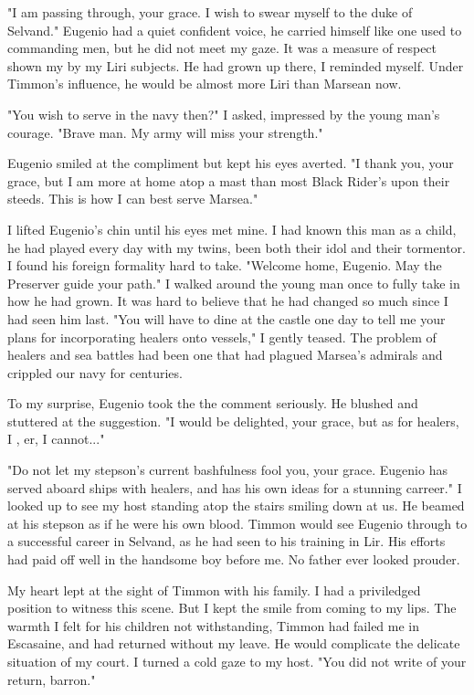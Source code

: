\documentclass{article}
\begin{document}
"I am passing through, your grace. I wish to swear myself to the duke of Selvand." Eugenio had a quiet confident voice, he carried himself like one used to commanding men, but he did not meet my gaze. It was a measure of respect shown my by my Liri subjects. He had grown up there, I reminded myself. Under Timmon's influence, he would be almost more Liri than Marsean now.

"You wish to serve in the navy then?" I asked, impressed by the young man's courage. "Brave man. My army will miss your strength."

Eugenio smiled at the compliment but kept his eyes averted. "I thank you, your grace, but I am more at home atop a mast than most Black Rider's upon their steeds. This is how I can best serve Marsea."

I lifted Eugenio's chin until his eyes met mine. I had known this man as a child, he had played every day with my twins, been both their idol and their tormentor. I found his foreign formality hard to take. "Welcome home, Eugenio. May the Preserver guide your path." I walked around the young man once to fully take in how he had grown. It was hard to believe that he had changed so much since I had seen him last. "You will have to dine at the castle one day to tell me your plans for incorporating healers onto vessels," I gently teased. The problem of healers and sea battles had been one that had plagued Marsea's admirals and crippled our navy for centuries. 

To my surprise, Eugenio took the the comment seriously. He blushed and stuttered at the suggestion. "I would be delighted, your grace, but as for healers, I , er, I cannot..."

"Do not let my stepson's current bashfulness fool you, your grace. Eugenio has served aboard ships with healers, and has his own ideas for a stunning carreer." I looked up to see my host standing atop the stairs smiling down at us. He beamed at his stepson as if he were his own blood. Timmon would see Eugenio through to a successful career in Selvand, as he had seen to his training in Lir. His efforts had paid off well in the handsome boy before me. No father ever looked prouder.

My heart lept at the sight of Timmon with his family. I had a priviledged position to witness this scene. But I kept the smile from coming to my lips. The warmth I felt for his children not withstanding, Timmon had failed me in Escasaine, and had returned without my leave. He would complicate the delicate situation of my court. I turned a cold gaze to my host. "You did not write of your return, barron."
\end{document}
